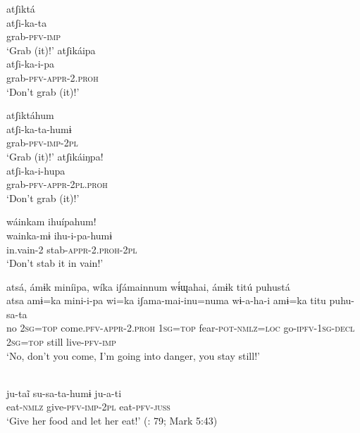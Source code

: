 \documentclass[output=paper,colorlinks,citecolor=brown,draft]{langscibook}
\begin{document}
\ea\label{ex:agu:11}
    \ea\label{ex:agu:11a}
        \glll atʃiktá \\ 
              atʃi-ka-ta \\
              grab-\textsc{pfv-imp} \\
        \glt ‘Grab (it)!’
    \ex\label{ex:agu:11b}
        \glll atʃikáipa \\
              atʃi-ka-i-pa \\
              grab-\textsc{pfv-appr-2.proh} \\
        \glt ‘Don’t grab (it)!’ \citep[74]{Overall2017b}
    \z
\z 

\ea\label{ex:agu:12}
    \ea\label{ex:agu:12a}
        \glll atʃiktáhum \\ 
              atʃi-ka-ta-humɨ \\
              grab-\textsc{pfv-imp-2pl} \\
        \glt ‘Grab (it)!’
    \ex\label{ex:agu:12b}
        \glll atʃikáiŋpa! \\
              atʃi-ka-i-hupa \\
              grab-\textsc{pfv{}-appr-2pl.proh} \\
        \glt ‘Don’t grab (it)!’ \citep[74]{Overall2017b}
    \z
\z 

\ea\label{ex:agu:13}
    \glll wáinkam ihuípahum!\\ 
          wainka\nobreakdash-mɨ  ihu-i-pa-humɨ\\
          in.vain-2  stab-\textsc{appr-2.proh-2pl} \\
    \glt ‘Don’t stab it in vain!’ \citep[75]{Overall2017b}
\z 

\ea\label{ex:agu:14}
    \glll atsá, ámɨk miníipa, wíka iʃámainnum wɨ́ɰahai, ámɨk titú puhustá \\ 
          atsa  amɨ=ka  mini-i-pa  wi=ka iʃama-mai-inu=numa  wɨ{}-a-ha-i  amɨ=ka  titu puhu-sa-ta \\
          no  \textsc{2sg}=\textsc{top}  come.\textsc{pfv-appr-2.proh}  \textsc{1sg}=\textsc{top} fear-\textsc{pot-nmlz=loc}  go\textsc{-ipfv-1sg-decl} \textsc{2sg=top} still live-\textsc{pfv-imp}\\
    \glt ‘No, don’t you come, I’m going into danger, you stay still!’ \citep[583]{Overall2017a}
\z           

\ea\label{ex:agu:15}
    \\ 
          ju-taĩ  su-sa-ta-humɨ  ju-a-ti \\
          eat-\textsc{nmlz}  give-\textsc{pfv-imp-2pl}  eat-\textsc{pfv-juss} \\
    \glt ‘Give her food and let her eat!’ (\citealt{LigaBíblica2008}: 79; Mark 5:43)
\z 
\end{document}
